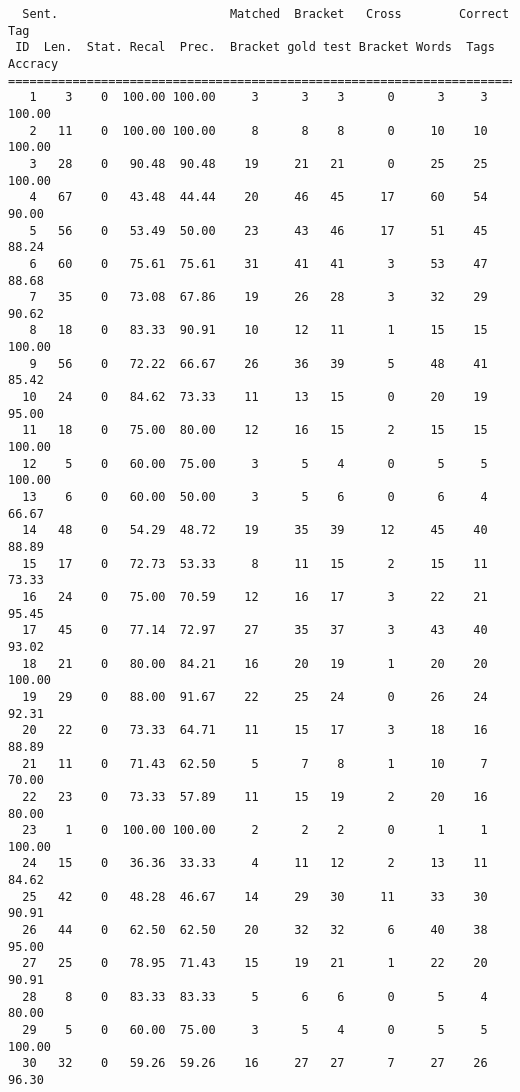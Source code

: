 \scriptsize
\begin{verbatim}
  Sent.                        Matched  Bracket   Cross        Correct Tag
 ID  Len.  Stat. Recal  Prec.  Bracket gold test Bracket Words  Tags Accracy
============================================================================
   1    3    0  100.00 100.00     3      3    3      0      3     3   100.00
   2   11    0  100.00 100.00     8      8    8      0     10    10   100.00
   3   28    0   90.48  90.48    19     21   21      0     25    25   100.00
   4   67    0   43.48  44.44    20     46   45     17     60    54    90.00
   5   56    0   53.49  50.00    23     43   46     17     51    45    88.24
   6   60    0   75.61  75.61    31     41   41      3     53    47    88.68
   7   35    0   73.08  67.86    19     26   28      3     32    29    90.62
   8   18    0   83.33  90.91    10     12   11      1     15    15   100.00
   9   56    0   72.22  66.67    26     36   39      5     48    41    85.42
  10   24    0   84.62  73.33    11     13   15      0     20    19    95.00
  11   18    0   75.00  80.00    12     16   15      2     15    15   100.00
  12    5    0   60.00  75.00     3      5    4      0      5     5   100.00
  13    6    0   60.00  50.00     3      5    6      0      6     4    66.67
  14   48    0   54.29  48.72    19     35   39     12     45    40    88.89
  15   17    0   72.73  53.33     8     11   15      2     15    11    73.33
  16   24    0   75.00  70.59    12     16   17      3     22    21    95.45
  17   45    0   77.14  72.97    27     35   37      3     43    40    93.02
  18   21    0   80.00  84.21    16     20   19      1     20    20   100.00
  19   29    0   88.00  91.67    22     25   24      0     26    24    92.31
  20   22    0   73.33  64.71    11     15   17      3     18    16    88.89
  21   11    0   71.43  62.50     5      7    8      1     10     7    70.00
  22   23    0   73.33  57.89    11     15   19      2     20    16    80.00
  23    1    0  100.00 100.00     2      2    2      0      1     1   100.00
  24   15    0   36.36  33.33     4     11   12      2     13    11    84.62
  25   42    0   48.28  46.67    14     29   30     11     33    30    90.91
  26   44    0   62.50  62.50    20     32   32      6     40    38    95.00
  27   25    0   78.95  71.43    15     19   21      1     22    20    90.91
  28    8    0   83.33  83.33     5      6    6      0      5     4    80.00
  29    5    0   60.00  75.00     3      5    4      0      5     5   100.00
  30   32    0   59.26  59.26    16     27   27      7     27    26    96.30

\end{verbatim}
